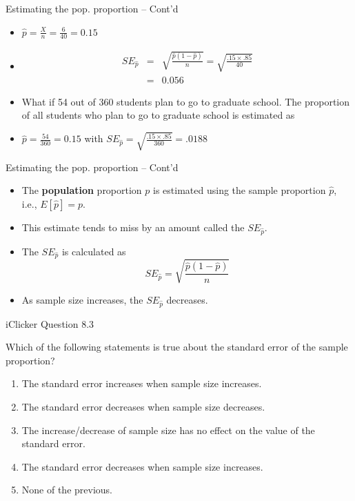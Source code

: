 \documentclass[14pt]{beamer}\usepackage[]{graphicx}\usepackage[]{color}
\begin{document}
\begin{frame}[fragile]{Estimating the pop. proportion -- Cont'd}

{\small{
\begin{itemize}
\item<1-> $\hat{p} = \frac{X}{n} = \frac{6}{40} = 0.15$

\item<2-> 
\begin{eqnarray*}
SE_{\hat{p}} &=& \sqrt{ \frac{\hat{p} (1 - \hat{p})}{n}} 
= \sqrt{ \frac{.15 \times .85}{40}} \\
&=& 0.056 
\end{eqnarray*}

\item<3-> What if 54 out of 360 students plan to go to graduate school. The  proportion of all students who plan to go to graduate school is  estimated as

\item<4-> $\hat{p} = \frac{54}{360} = 0.15$ with $SE_{\hat{p}} = \sqrt{ \frac{.15 \times .85}{360}} = .0188$

\end{itemize}
}}
\end{frame}

\begin{frame}[fragile]{Estimating the pop. proportion -- Cont'd}

\begin{itemize}
\item<1-> The \textbf{population} proportion $p$ is estimated using the sample proportion $\hat{p}$,  i.e., $E[ \hat{p}] = p$.   

\item<2-> This estimate tends to miss by an amount called the $SE_{\hat{p}}$.

\item<3-> The $SE_{\hat{p}}$ is calculated as 
\begin{equation*}
SE_{\hat{p}} = \sqrt{ \frac{ \hat{p} ( 1 - \hat{p})}{n}}
\end{equation*}

\item<4-> As sample size increases, the $SE_{\hat{p}}$ decreases.
\end{itemize}
\end{frame}

\begin{frame}[fragile]{iClicker Question 8.3}

Which of the following statements is true about the standard error of  the sample proportion?

\begin{enumerate}
\item The standard error increases when sample size  increases.
\item The standard error decreases when sample size  decreases.
\item The increase/decrease of sample size has no effect on  the value of the standard error.
\item The standard error decreases when sample size  increases.
\item None of the previous.
\end{enumerate}
\end{frame}
\end{document}
